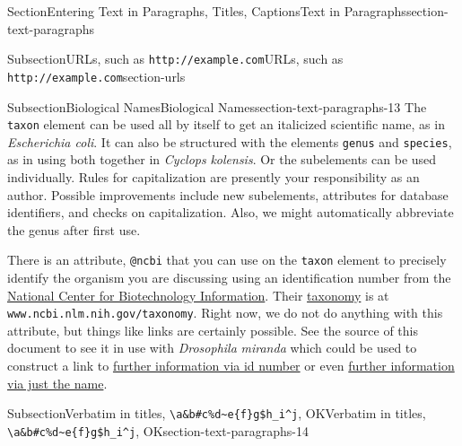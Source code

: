 \documentclass[twoside,10pt,]{article}
\newcommand{\mono}[1]{\texttt{#1}}
\numberwithin{equation}{section}
\begin{document}
\begin{sectionptx}{Section}{Entering Text in Paragraphs, Titles, Captions}{}{Text in Paragraphs}{}{}{section-text-paragraphs}
\begin{subsectionptx}{Subsection}{URLs, such as \mono{http://example.com}}{}{URLs, such as \mono{http://example.com}}{}{}{section-urls}
\end{subsectionptx}
%
%
\typeout{************************************************}
\typeout{************************************************}
%
\begin{subsectionptx}{Subsection}{Biological Names}{}{Biological Names}{}{}{section-text-paragraphs-13}
%
%
%
The \mono{taxon} element can be used all by itself to get an italicized scientific name, as in \textit{Escherichia coli}.  It can also be structured with the elements \mono{genus} and \mono{species}, as in using both together in \textit{Cyclops} \textit{kolensis}.  Or the subelements can be used individually.  Rules for capitalization are presently your responsibility as an author.  Possible improvements include new subelements, attributes for database identifiers, and checks on capitalization.  Also, we might automatically abbreviate the genus after first use.%
\par
There is an attribute, \mono{@ncbi} that you can use on the \mono{taxon} element to precisely identify the organism you are discussing using an identification number from the \href{https://www.ncbi.nlm.nih.gov/}{National Center for Biotechnology Information}.  Their \href{https://www.ncbi.nlm.nih.gov/taxonomy}{taxonomy} is at \mono{www.ncbi.nlm.nih.gov/taxonomy}.  Right now, we do not do anything with this attribute, but things like links are certainly possible.  See the source of this document to see it in use with \textit{Drosophila} \textit{miranda} which could be used to construct a link to \href{https://www.ncbi.nlm.nih.gov/Taxonomy/Browser/wwwtax.cgi?id=7229}{further information via id number} or even \href{https://www.ncbi.nlm.nih.gov/Taxonomy/Browser/wwwtax.cgi?name=Drosophila+miranda}{further information via just the name}.%
\end{subsectionptx}
%
%
\typeout{************************************************}
\typeout{Subsection 9.10 Verbatim in titles, \mono{\textbackslash{}a\&b\#c\%d\textasciitilde{}e\{f\}g\$h\_i\textasciicircum{}j}, OK}
\typeout{************************************************}
%
\begin{subsectionptx}{Subsection}{Verbatim in titles, \mono{\textbackslash{}a\&b\#c\%d\textasciitilde{}e\{f\}g\$h\_i\textasciicircum{}j}, OK}{}{Verbatim in titles, \mono{\textbackslash{}a\&b\#c\%d\textasciitilde{}e\{f\}g\$h\_i\textasciicircum{}j}, OK}{}{}{section-text-paragraphs-14}

\end{subsectionptx}
\end{sectionptx}
\end{document}
